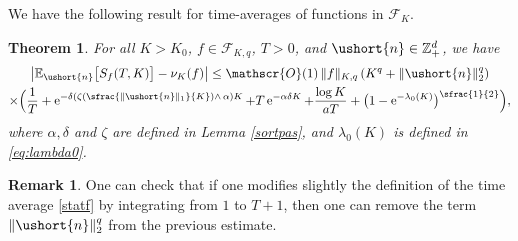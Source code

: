 \documentclass[JEP,XML,SOM,Unicode]{cedram}
\newcommand{\Psfrac}[2]{(\sfrac{#1}{#2})}
\newcommand{\scaleto}[2]{#1}
\let\mathcal\mathscr
\numberwithin{equation}{section}
\theoremstyle{plain}
\newtheorem{theorem}{Theorem}[section]
\theoremstyle{definition}
\newtheorem{remark}{Remark}[section]
\newcommand{\E}{{\mathbb{E}}}
\newcommand{\zentiers}{{\mathbb{Z}}}
\newcommand{\domaine}{\zentiers_{+}^{d}}
\newcommand{\Oun}{\mathcal{O}(1)}
\newcommand{\sK}{K}
\newcommand{\vecn}{\ushort{n}}
\newcommand{\nuk}{\nu_{K}}\let\snuk\nuk
\newcommand{\e}{\operatorname{e}}
\newcommand{\normdeux}[1]{\|#1\|_{2}}\let\snormdeux\normdeux
\begin{document}
We have the following result for time-averages of functions in $\mathscr{F}\!_{\sK}$.
\begin{theorem}\label{pseudoergod}
For all $K>K_0$, $f\in\mathscr{F}\!_{\sK,q}$, $T>0$, and $\vecn\in \domaine$, we have
\begin{multline*}
\left|\E_{\vecn}\bigl[S_{f}(T,K)\bigr]-\nuk(f)\right|
\leq \Oun\, \|f\|_{\sK,q}\,(K^{q}+\normdeux{\vecn}^{\scaleto{q}{3.6pt}})\\
\times \Bigl(\frac{1}{T} + \e^{-\delta\left(\zeta\Psfrac{\|\vecn\|_{1}}{K}\wedge\,\alpha\right)K}
+T\e^{-\alpha\delta K}+\frac{\log K}{a T}+ \bigl(1-\e^{-\lambda_0(K)}\bigr)^{\sfrac{1}{2}} \Bigr),
\end{multline*}
where $\alpha, \delta$ and $\zeta$ are defined in Lemma \ref{sortpas}, and $\lambda_0(K)$ is defined in \eqref{eq:lambda0}.
\end{theorem}
\begin{remark}
One can check that if one modifies slightly the definition of the time average \eqref{statf} by integrating from $1$ to $T+1$,
then one can remove the term $\normdeux{\vecn}^{q}$ from the previous estimate.
\end{remark}
\end{document}
